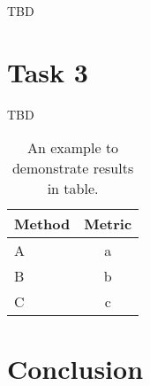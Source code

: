 \documentclass[final]{cvpr}
\begin{document}
TBD


\section{Task 3}
TBD


\begin{table}[htb]
\begin{center}
\begin{tabular}{|l|c|}
\hline
Method & Metric \\
\hline
A & a \\
B & b \\
C & c\\
\hline
\end{tabular}
\end{center}
\caption{An example to demonstrate results in table.}
\end{table}

\section{Conclusion}

{\small


}
\end{document}

